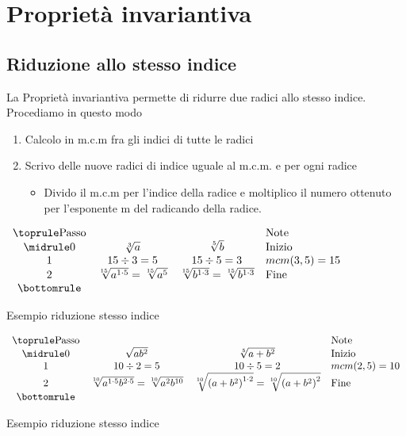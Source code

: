 \section{Proprietà invariantiva}
\label{Sec:Propinvariantivaradicali}
\subsection{Riduzione allo stesso indice}
\label{sec:RiduzioneAlloStessoIndice}

La Proprietà invariantiva permette di ridurre due radici allo stesso indice. Procediamo in questo modo
\begin{enumerate}
	\item Calcolo in m.c.m fra gli indici di tutte le radici
	\item Scrivo delle nuove radici di indice uguale al m.c.m. e per ogni radice
	\begin{itemize}
	\item Divido il m.c.m per l'indice  della radice e moltiplico il numero ottenuto per l'esponente m del radicando della  radice.
	\end{itemize}
\end{enumerate}

\begin{table}[H]
\centering
$
\begin{array}{cccl}
\toprule
\text{Passo} &  &  & \text{Note} \\  
\midrule
0 & \sqrt[3]{a} &\sqrt[5]{b}  &\text{Inizio} \\ 
1 & 15\div 3=5 &15\div 5=3  & mcm(3,5)=15 \\  
2 &\sqrt[15]{a^{1\cdot5}}=\sqrt[15]{a^{5}}  &\sqrt[15]{b^{1\cdot3}}=\sqrt[15]{b^{1\cdot3}}  &\text{Fine} \\
\bottomrule	
\end{array} 
$
\label{tab:Es1Ridstessoindice}
\caption{Esempio riduzione stesso indice}
\end{table}
\begin{table}[H]
\centering
$
\begin{array}{cccl}
\toprule
\text{Passo} &  &  &\text{Note} \\  
\midrule
0 & \sqrt{ab^2} &\sqrt[5]{a+b^2}  &\text{Inizio} \\ 
1 & 10\div 2=5 &10\div 5=2  & mcm(2,5)=10 \\  
2 &\sqrt[10]{a^{1\cdot 5}b^{2\cdot 5}}=\sqrt[10]{a^{2}b^{10}}& \sqrt[10]{\left( a+b^2\right)^{1\cdot 2} }=\sqrt[10]{\left( a+b^2\right)^{2} }   &\text{Fine} \\
\bottomrule	
\end{array} 
$
\label{tab:Es1Ridstessoindice2}
\caption{Esempio riduzione stesso indice}
\end{table}
